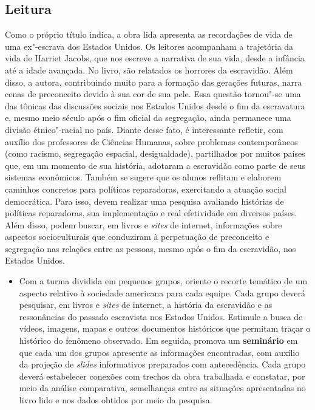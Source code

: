 \documentclass[12pt]{extarticle}
\begin{document}
\subsection{Leitura}

Como o próprio título indica, a obra lida apresenta as
recordações de vida de uma ex"-escrava dos Estados Unidos. Os leitores
acompanham a trajetória da vida de Harriet Jacobs, que nos escreve a
narrativa de sua vida, desde a infância até a idade avançada. No livro,
são relatados os horrores da escravidão. Além disso, a autora,
contribuindo muito para a formação das gerações futuras, narra cenas de
preconceito devido à sua cor de sua pele. Essa questão tornou"-se uma das
tônicas das discussões sociais nos Estados Unidos desde o fim da
escravatura e, mesmo meio século após o fim oficial da segregação, ainda
permanece uma divisão étnico"-racial no país. Diante desse fato, é
interessante refletir, com auxílio dos professores de Ciências Humanas,
sobre problemas contemporâneos (como racismo, segregação espacial,
desigualdade), partilhados por muitos países que, em um momento de sua
história, adotaram a escravidão como parte de seus sistemas econômicos.
Também se sugere que os alunos reflitam e elaborem caminhos concretos
para políticas reparadoras, exercitando a atuação social democrática.
Para isso, devem realizar uma pesquisa avaliando histórias de políticas
reparadoras, sua implementação e real efetividade em diversos países.
Além disso, podem buscar, em livros e \emph{sites} de internet,
informações sobre aspectos socioculturais que conduziram à perpetuação
de preconceito e segregação nas relações entre as pessoas, mesmo após o
fim da escravidão, nos Estados Unidos.

\begin{itemize}
\item
  Com a turma dividida em pequenos grupos, oriente o recorte temático de
  um aspecto relativo à sociedade americana para cada equipe. Cada grupo
  deverá pesquisar, em livros e \emph{sites} de internet, a história da
  escravidão e as ressonâncias do passado escravista nos Estados Unidos.
  Estimule a busca de vídeos, imagens, mapas e outros documentos
  históricos que permitam traçar o histórico do fenômeno observado. Em
  seguida, promova um \textbf{seminário} em que cada um dos grupos
  apresente as informações encontradas, com auxílio da projeção de
  \emph{slides} informativos preparados com antecedência. Cada grupo
  deverá estabelecer conexões com trechos da obra trabalhada e
  constatar, por meio da análise comparativa, semelhanças entre as
  situações apresentadas no livro lido e nos dados obtidos por meio da
  pesquisa.
\end{itemize}
\end{document}
